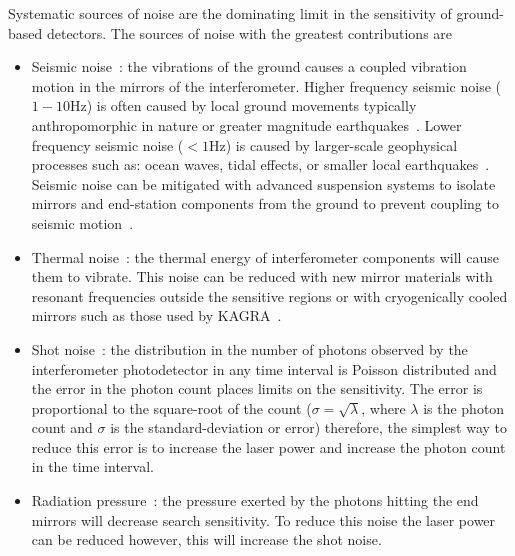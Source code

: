 Systematic sources of noise are the dominating limit in the sensitivity of ground-based detectors. The sources of noise with the greatest contributions are
%
\begin{itemize}
    \item Seismic noise~\cite{Glanzer:2023}: the vibrations of the ground causes a coupled vibration motion in the mirrors of the interferometer. Higher frequency seismic noise ($1-10$Hz) is often caused by local ground movements typically anthropomorphic in nature or greater magnitude earthquakes~\cite{Nuttall:2018}. Lower frequency seismic noise ($<1$Hz) is caused by larger-scale geophysical processes such as: ocean waves, tidal effects, or smaller local earthquakes~\cite{aLIGO:2015}. Seismic noise can be mitigated with advanced suspension systems to isolate mirrors and end-station components from the ground to prevent coupling to seismic motion~\cite{seismic_isolation:2015}.
    \item Thermal noise~\cite{thermal_noise:2018}: the thermal energy of interferometer components will cause them to vibrate. This noise can be reduced with new mirror materials with resonant frequencies outside the sensitive regions or with cryogenically cooled mirrors such as those used by KAGRA~\cite{KAGRA:2021}.
    \item Shot noise~\cite{quantum_noise:2003}: the distribution in the number of photons observed by the interferometer photodetector in any time interval is Poisson distributed and the error in the photon count places limits on the sensitivity. The error is proportional to the square-root of the count ($\sigma = \sqrt{\lambda}$, where $\lambda$ is the photon count and $\sigma$ is the standard-deviation or error) therefore, the simplest way to reduce this error is to increase the laser power and increase the photon count in the time interval.
    \item Radiation pressure~\cite{quantum_noise:2003}: the pressure exerted by the photons hitting the end mirrors will decrease search sensitivity. To reduce this noise the laser power can be reduced however, this will increase the shot noise.
\end{itemize}

